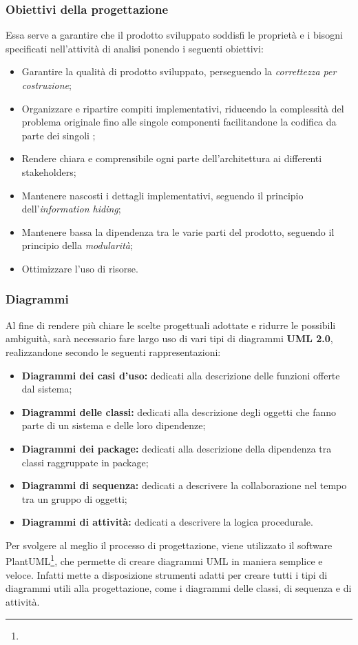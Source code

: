 \documentclass[NormeDiProgetto.tex]{subfiles}
\begin{document}
\subsubsection{Obiettivi della progettazione}
Essa serve a garantire che il prodotto sviluppato soddisfi le proprietà e i bisogni specificati nell'attività di analisi ponendo i seguenti obiettivi:
\begin{itemize}
	\item Garantire la qualità di prodotto sviluppato, perseguendo la \textit{correttezza per costruzione};
	\item Organizzare e ripartire compiti implementativi, riducendo la
	complessità del problema originale fino alle singole componenti
	facilitandone la codifica da parte dei singoli \progri;
	\item Rendere chiara e comprensibile ogni parte dell'architettura ai differenti stakeholders;
	\item Mantenere nascosti i dettagli implementativi, seguendo il principio dell'\textit{information hiding};
	\item Mantenere bassa la dipendenza tra le varie parti del prodotto, seguendo il principio della \textit{modularità};
	\item Ottimizzare l'uso di risorse.
\end{itemize}
\subsubsection{Diagrammi}
Al fine di rendere più chiare le scelte progettuali adottate e
ridurre le possibili ambiguità, sarà necessario fare largo uso di vari tipi di diagrammi 
\textbf{UML 2.0}, realizzandone secondo le seguenti rappresentazioni:
\begin{itemize}
	\item \textbf{Diagrammi dei casi d'uso:} dedicati alla descrizione delle funzioni offerte dal sistema;
	\item \textbf{Diagrammi delle classi:} dedicati alla descrizione degli oggetti che fanno parte di un sistema e delle loro dipendenze;
	\item \textbf{Diagrammi dei package:} dedicati alla descrizione della dipendenza tra classi raggruppate in package;
	\item \textbf{Diagrammi di sequenza:} dedicati a descrivere la collaborazione nel tempo tra un gruppo di oggetti;
	\item \textbf{Diagrammi di attività:} dedicati a descrivere la logica procedurale.
\end{itemize}
Per svolgere al meglio il processo di progettazione, viene utilizzato il software PlantUML\footnote{}, che permette di creare diagrammi UML in maniera semplice e veloce. Infatti mette a disposizione strumenti adatti per creare tutti i tipi di diagrammi utili alla progettazione, come i diagrammi delle classi, di sequenza e di attività.
\end{document}
